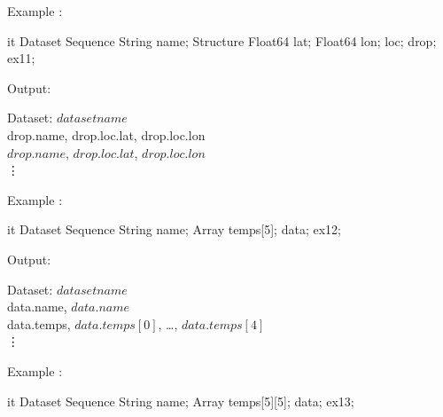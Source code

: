 \documentclass{article}
\begin{document}
\begin{enumerate}
\T\begin{minipage}{5in}
Example :
\T\medskip

\begin{vcode}{it}
Dataset {
  Sequence {
    String name;
    Structure {
      Float64 lat;
      Float64 lon;
    } loc;
  } drop;
} ex11;
\end{vcode}
\T\medskip

Output:\\
\begin{ttfamily}  
Dataset: $dataset name$\\
drop.name, drop.loc.lat, drop.loc.lon\\
$drop.name$, $drop.loc.lat$, $drop.loc.lon$\\
\vdots
\end{ttfamily}
\T\end{minipage}
\T\bigskip

\T\begin{minipage}{5in}
Example :
\T\medskip

\begin{vcode}{it}
Dataset {
  Sequence {
    String name;
    Array temps[5];
  } data;
} ex12;
\end{vcode}
\T\medskip

Output:\\
\begin{ttfamily}
Dataset: $dataset name$\\
data.name, $data.name$\\
data.temps, $data.temps[0]$, \ldots, $data.temps[4]$\\
\vdots
\end{ttfamily}
\T\end{minipage}
\T\bigskip

\T\begin{minipage}{5in}
Example :
\T\medskip

\begin{vcode}{it}
Dataset {
  Sequence {
    String name;
    Array temps[5][5];
  } data;
}ex13;
\end{vcode}
\T\medskip


\end{minipage}
\end{enumerate}
\end{document}
